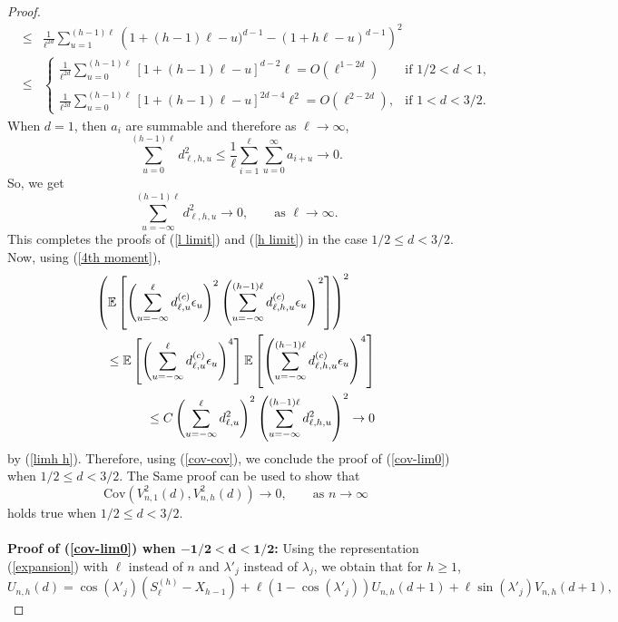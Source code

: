 \documentclass[12pt]{article}
\begin{document}
\begin{proof}
\begin{eqnarray*}
&\le&\frac{1}{\ell^{2d}}\sum_{u=1}^{(h-1)\ell}\left(1+(h-1)\ell-u)^{d-1}-(1+h\ell-u)^{d-1}\right)^2\\
&\le&\begin{cases} 
    \frac{1}{\ell^{2d}}\displaystyle\sum_{u=0}^{(h-1)\ell}[1+(h-1)\ell-u]^{d-2}\ell=O\left(\ell^{1-2d}\right)&\textrm{if }1/2<d<1,\\\\
  \frac{1}{\ell^{2d}}\displaystyle\sum_{u=0}^{(h-1)\ell}[1+(h-1)\ell-u]^{2d-4}\ell^2=O\left(\ell^{2-2d}\right),&\textrm{if }1<d<3/2.
\end{cases}
\end{eqnarray*} 
When $d=1$, then $a_i$ are summable and therefore as $\ell\to\infty$,
$$
\sum_{u=0}^{(h-1)\ell} d_{\ell,h,u}^2\le\frac{1}{\ell}\sum_{i=1}^\ell\sum_{u=0}^\infty a_{i+u}\to0.
$$
So, we get
\begin{equation}\label{limh h}
\sum_{u=-\infty}^{(h-1)\ell}d_{\ell,h,u}^2\to0,\qquad\textrm{as }\ell\to\infty.
\end{equation}
This completes the proofs of (\ref{l limit}) and (\ref{h limit})  in the case $1/2\le d<3/2$.
Now, using (\ref{4th moment}),
\begin{eqnarray*}\lefteqn{
\left(\mathbb{E}\left[\left(\sum_{u=-\infty}^\ell d_{\ell,u}^{(c)}\epsilon_u\right)^2\left(\sum_{u=-\infty}^{(h-1)\ell} d_{\ell,h,u}^{(c)}\epsilon_u\right)^2\right]\right)^2}\\
&&\le
\mathbb{E}\left[\left(\sum_{u=-\infty}^\ell d_{\ell,u}^{(c)}\epsilon_u\right)^4\right]\mathbb{E}\left[\left(\sum_{u=-\infty}^{(h-1)\ell} d_{\ell,h,u}^{(c)}\epsilon_u\right)^4\right]\\
&&\le C\left(\sum_{u=-\infty}^\ell d_{\ell,u}^2\right)^2\left(\sum_{u=-\infty}^{(h-1)\ell}d_{\ell,h,u}^2\right)^2\to0
\end{eqnarray*}
by (\ref{limh h}). Therefore, using (\ref{cov-cov}), we conclude  the proof of (\ref{cov-lim0}) when $1/2\le d<3/2$. The Same proof can be used  to show that
\begin{equation}\label{vn-vn}
\textrm{Cov}(V^2_{n,1}(d),V_{n,h}^2(d))\to0,\qquad\textrm{as }n\to\infty
\end{equation}
holds true when $1/2\le d<3/2.$\\\\
{\bf Proof of (\ref{cov-lim0}) when $\mathbf{-1/2<d<1/2}$:}  Using the representation (\ref{expansion}) with $\ell$ instead of $n$ and $\lambda'_j$ instead of $\lambda_j$, we obtain that for $h\ge1$,
$$
U_{n,h}(d)=\cos(\lambda'_j)(S_\ell^{(h)}-X_{h-1})+\ell(1-\cos(\lambda'_j))U_{n,h}(d+1)+\ell\sin(\lambda'_j)V_{n,h}(d+1),
$$
\end{proof}
\end{document}
